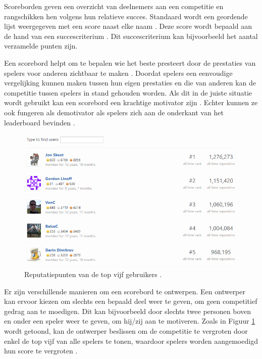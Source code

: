 Scoreborden geven een overzicht van deelnemers aan een competitie \autocite{Costa2013} en rangschikken hen volgens hun relatieve succes. Standaard wordt een geordende lijst weergegeven met een score naast elke naam \autocite{Zichermann2011}. Deze score wordt bepaald aan de hand van een succescriterium \autocite{Sailer2016}. Dit succescriterium kan bijvoorbeeld het aantal verzamelde punten zijn.

Een scorebord helpt om te bepalen wie het beste presteert door de prestaties van spelers voor anderen zichtbaar te maken \autocite{Costa2019}. Doordat spelers een eenvoudige vergelijking kunnen maken tussen hun eigen prestaties en die van anderen \autocite{Zichermann2011} kan de competitie tussen spelers in stand gehouden worden. Als dit in de juiste situatie wordt gebruikt kan een scorebord een krachtige motivator zijn \autocite{Costa2019}. Echter kunnen ze ook fungeren als demotivator als spelers zich aan de onderkant van het leaderboard bevinden \autocite{Sailer2016}.

\begin{figure}
    \includegraphics[width=\linewidth]{Leaderboard.png}
    \caption{Reputatiepunten van de top vijf gebruikers \autocite{Leaderboard2021}.}
    \label{fig:leaderboard}
\end{figure}

Er zijn verschillende manieren om een scorebord te ontwerpen. Een ontwerper kan ervoor kiezen om slechts een bepaald deel weer te geven, om geen competitief gedrag aan te moedigen. Dit kan bijvoorbeeld door slechts twee personen boven en onder een speler weer te geven, om hij/zij aan te motiveren. Zoals in Figuur \ref{fig:leaderboard} wordt getoond, kan de ontwerper beslissen om de competitie te vergroten door enkel de top vijf van alle spelers te tonen, waardoor spelers worden aangemoedigd hun score te vergroten \autocite{Costa2019}.


